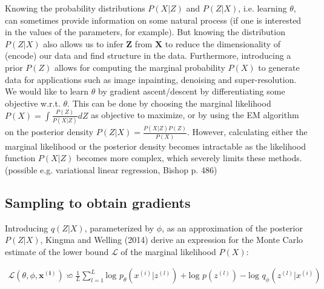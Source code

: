 \documentclass{article}
\begin{document}
Knowing the probability distributions $P(X|Z)$ and $P(Z|X)$, i.e. learning $\theta$, can sometimes provide information on some natural process (if one is interested in the values of the parameters, for example). But knowing the distribution $P(Z|X)$ also allows us to infer $\mathbf{Z}$ from $\mathbf{X}$ to reduce the dimensionality of (encode) our data and find structure in the data. Furthermore, introducing a prior $P(Z)$ allows for computing the marginal probability $P(X)$ to generate data for applications such as image inpainting, denoising and super-resolution.
We would like to learn $\theta$ by gradient ascent/descent by differentiating some objective w.r.t. $\theta$. This can be done by choosing the marginal likelihood $P(X) = \int \frac{P(Z)}{P(X|Z)}dZ$ as objective to maximize, or by using the EM algorithm on the posterior density $ P(Z|X) = \frac{P(X|Z)P(Z)}{P(X)}$. However, calculating either  the marginal likelihood or the posterior density becomes intractable as the likelihood function $P(X|Z)$	 becomes more complex, which severely limits these methods. (possible e.g. variational linear regression, Bishop p. 486)






\subsection{Sampling to obtain gradients}

Introducing $q(Z|X)$, parameterized by $\phi$, as an approximation of the posterior $P(Z|X)$, Kingma and Welling (2014) derive an expression for the Monte Carlo estimate of the lower bound $\mathcal{L}$ of the marginal likelihood $P(X)$:

\begin{align}
\mathcal{L}(\theta ,\phi ,  \mathbf{x^{(i)}}) \backsimeq \frac{1}{L} \sum_{l=1}^{L} \text{log } p_{\theta} (x^{(i)}|z^{(l)})+ \text{log }p(z^{(l)}	)-\text{log }q_{\phi}(z^{(l)}|x^{(i)})
\end{align}
\end{document}
